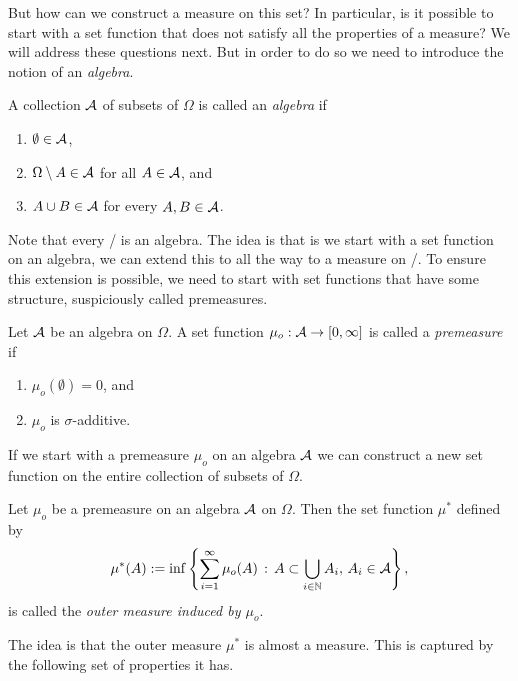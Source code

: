  But how can we construct a measure on this set? In particular, is it possible to start with a set function that does not satisfy all the properties of a measure? We will address these questions next. But in order to do so we need to introduce the notion of an \emph{algebra}.

\begin{definition}
A collection $\mathcal A$ of subsets of $\Omega$ is called an \emph{algebra} if
\begin{enumerate}
\item $\emptyset \in \mathcal A$,
\item $\Omega \setminus A \in \mathcal A$ for all $A \in \mathcal A$, and
\item $A \cup B \in \mathcal A$ for every $A, B \in \mathcal A$.
\end{enumerate}
\end{definition}

Note that every \sigalg/ is an algebra. The idea is that is we start with a set function on an algebra, we can extend this to all the way to a measure on \sigalg/. To ensure this extension is possible, we need to start with set functions that have some structure, suspiciously called premeasures. 

\begin{definition}[Premeasures]
Let $\mathcal A$ be an algebra on $\Omega$. A set function $\mu_o : \mathcal A \to [0,\infty]$ is called a \emph{premeasure} if
\begin{enumerate}
\item $\mu_o(\emptyset) = 0$, and
\item $\mu_o$ is $\sigma$-additive.
\end{enumerate}
\end{definition}

If we start with a premeasure $\mu_o$ on an algebra $\mathcal A$ we can construct a new set function on the entire collection of subsets of $\Omega$.

\begin{definition}
Let $\mu_o$ be a premeasure on an algebra $\mathcal A$ on $\Omega$. Then the set function $\mu^\ast$ defined by
\[
	\mu^\ast(A) := \inf \left\{\sum_{i = 1}^\infty \mu_o(A) \, : \, A \subset \bigcup_{i \in \mathbb N} A_i, \, A_i \in \mathcal A\right\},
\]
is called the \emph{outer measure induced by $\mu_o$}. 
\end{definition}

The idea is that the outer measure $\mu^\ast$ is almost a measure. This is captured by the following set of properties it has.

